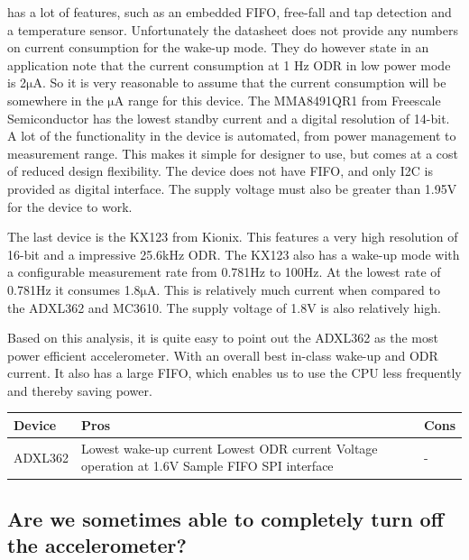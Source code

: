 has a lot of features, such as an embedded FIFO, free-fall and tap detection and a temperature sensor. Unfortunately the datasheet does not provide any numbers on current consumption for the wake-up mode. They do however state in an application note \cite{lis3dh_appnote} that the current consumption at 1 Hz ODR in low power mode is 2$\si{\micro\ampere}$. So it is very reasonable to assume that the current consumption will be somewhere in the $\si{\micro\ampere}$ range for this device. The MMA8491QR1 from Freescale Semiconductor has the lowest standby current and a digital resolution of 14-bit. A lot of the functionality in the device is automated, from power management to measurement range. This makes it simple for designer to use, but comes at a cost of reduced design flexibility. The device does not have FIFO, and only I2C is provided as digital interface. The supply voltage must also be greater than 1.95V for the device to work. 

The last device is the KX123 from Kionix. This features a very high resolution of 16-bit and a impressive 25.6kHz ODR. The KX123 also has a wake-up mode with a configurable measurement rate from 0.781Hz to 100Hz. At the lowest rate of 0.781Hz it consumes 1.8$\si{\micro\ampere}$. This is relatively much current when compared to the ADXL362 and MC3610. The supply voltage of 1.8V is also relatively high.

Based on this analysis, it is quite easy to point out the ADXL362 as the most power efficient accelerometer. With an overall best in-class wake-up and ODR current. It also has a large FIFO, which enables us to use the CPU less frequently and thereby saving power. 


\begin{center}
    \begin{tabular}{ | p{2cm} | p{5cm} | p{5cm} |}
    \hline
    Device & Pros & Cons \\ \hline
    ADXL362 & Lowest wake-up current \newline Lowest ODR current \newline Voltage operation at 1.6V \newline 512 Sample FIFO \newline SPI interface  & - \\ \hline
    \end{tabular}
\end{center}

\subsection{Are we sometimes able to completely turn off the accelerometer?}

